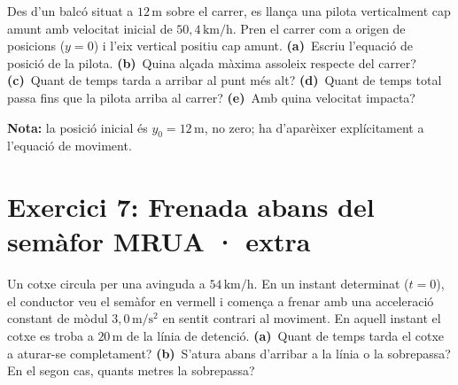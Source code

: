 \documentclass[11pt,a4paper]{article}
\begin{document}
Des d'un balcó situat a $12\,\mathrm{m}$ sobre el carrer, es llança una pilota verticalment cap amunt amb velocitat inicial de $50{,}4\,\mathrm{km/h}$. Pren el carrer com a origen de posicions ($y=0$) i l'eix vertical positiu cap amunt. \textbf{(a)}~Escriu l'equació de posició de la pilota. \textbf{(b)}~Quina alçada màxima assoleix respecte del carrer? \textbf{(c)}~Quant de temps tarda a arribar al punt més alt? \textbf{(d)}~Quant de temps total passa fins que la pilota arriba al carrer? \textbf{(e)}~Amb quina velocitat impacta?

\begin{center}
\end{center}

\textbf{Nota:} la posició inicial és $y_0=12\,\mathrm{m}$, no zero; ha d'aparèixer explícitament a l'equació de moviment.

\clearpage

\section*{Exercici 7: Frenada abans del semàfor \hfill \normalfont MRUA · extra}

Un cotxe circula per una avinguda a $54\,\mathrm{km/h}$. En un instant determinat ($t=0$), el conductor veu el semàfor en vermell i comença a frenar amb una acceleració constant de mòdul $3{,}0\,\mathrm{m/s^2}$ en sentit contrari al moviment. En aquell instant el cotxe es troba a $20\,\mathrm{m}$ de la línia de detenció. \textbf{(a)}~Quant de temps tarda el cotxe a aturar-se completament? \textbf{(b)}~S'atura abans d'arribar a la línia o la sobrepassa? En el segon cas, quants metres la sobrepassa?
\end{document}

